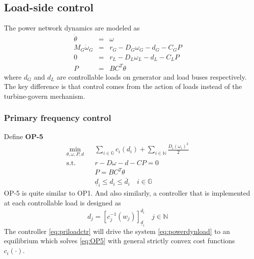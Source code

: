 \documentclass[journal,12pt,onecolumn,draftclsnofoot]{IEEEtran}
\begin{document}
\subsection{Load-side control}

The power network dynamics are modeled as
\begin{subequations}
	\begin{eqnarray}
		\label{eq:powerdynload-1}
		\dot \theta & = &  \omega \\
		\label{eq:powerdynload-2}
		M_G \dot \omega_G &  = & r_G  - D_G \omega_G  - d_G -  C_G P \\
		\label{eq:powerdynload-3}
		0 & = & r_L - D_L \omega_L  - d_L - C_L P\\
		\label{eq:powerdynload-4}
		P & = & BC^T \theta 
	\end{eqnarray}\label{eq:powerdynload}%
\end{subequations}
where $d_G$ and $d_L$ are controllable loads on generator and load buses respectively.
The key difference is that control comes from the action of loads instead of the turbine-govern mechanism.

\subsubsection{Primary frequency control \cite{zhao2014design}}

Define 
\noindent
\textbf{OP-5}
\begin{subequations}
	\begin{eqnarray}
		\min_{\theta, \omega, P, d} && \sum_{i\in\mathbb{G}} c_i(d_i) +\sum_{i\in\mathbb{N}} \frac{D_i (\omega_i)^2}{2} \\
		\mathrm{s.t.} && r-D\omega-d-C P=0 \\
		&& P=BC^T\theta\\
		\label{eq:OP5-5}
		&& \underline{d}_i \le d_i \le \overline{d}_i \quad   i \in \mathbb{G}
	\end{eqnarray}\label{eq:OP5}%
\end{subequations}
OP-5 is quite similar to OP1. And also similarly, a controller that is implemented at each controllable load is designed as
\begin{equation}\label{eq:priloadctr}
d_j=\left[c_j^{-1}(w_j)\right]_{\underline{d}_i}^{\overline{d}_i} \quad j\in\mathbb{N}
\end{equation}
The controller \eqref{eq:priloadctr} will drive the system \eqref{eq:powerdynload} to an equilibrium which solves \eqref{eq:OP5} with general strictly convex cost functions $c_i(\cdot)$.
\end{document}

